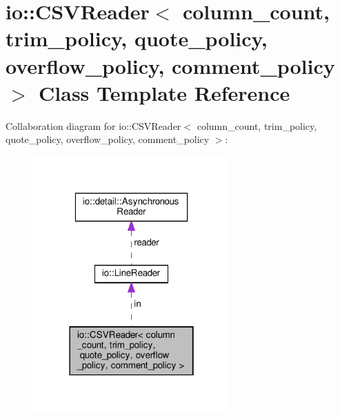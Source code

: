 \hypertarget{classio_1_1CSVReader}{}\section{io\+:\+:C\+S\+V\+Reader$<$ column\+\_\+count, trim\+\_\+policy, quote\+\_\+policy, overflow\+\_\+policy, comment\+\_\+policy $>$ Class Template Reference}
\label{classio_1_1CSVReader}


Collaboration diagram for io\+:\+:C\+S\+V\+Reader$<$ column\+\_\+count, trim\+\_\+policy, quote\+\_\+policy, overflow\+\_\+policy, comment\+\_\+policy $>$\+:\nopagebreak
\begin{figure}[H]
\begin{center}
\leavevmode
\includegraphics[width=214pt]{classio_1_1CSVReader__coll__graph}
\end{center}
\end{figure}
